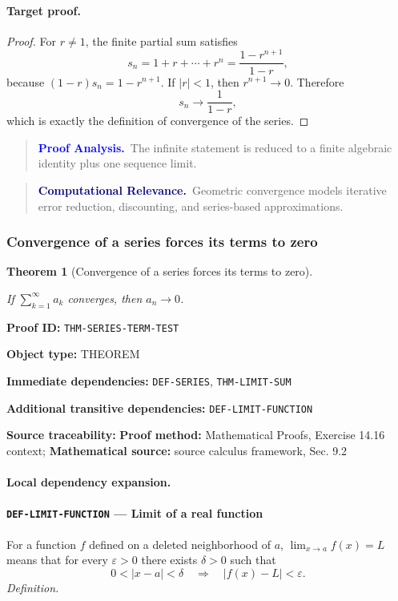 \documentclass[10pt]{article}
\newcommand{\pidraw}[1]{\begingroup\urlstyle{tt}\nolinkurl{#1}\endgroup}
\newtheorem{theorem}{Theorem}[section]
\theoremstyle{definition}
\theoremstyle{remark}
\newenvironment{proofanalysis}
{\begin{quote}\small\noindent\textbf{\textcolor{blue}{Proof Analysis.}}\ }
{\end{quote}}
\newenvironment{computationalrelevance}
{\begin{quote}\small\noindent\textbf{\textcolor{navy}{Computational Relevance.}}\ }
{\end{quote}}
\newcommand{\meta}[2]{\noindent\textbf{#1:} #2\par}
\begin{document}
\paragraph{Target proof.}

\begin{proof}

For $r\ne1$, the finite partial sum satisfies
\[
s_n=1+r+\cdots+r^n=\frac{1-r^{n+1}}{1-r},
\]
because $(1-r)s_n=1-r^{n+1}$. If $|r|<1$, then $r^{n+1}\to0$.
Therefore
\[
s_n\to\frac{1}{1-r},
\]
which is exactly the definition of convergence of the series.

\end{proof}

\begin{proofanalysis}The infinite statement is reduced to a finite algebraic identity plus one sequence limit.\end{proofanalysis}

\begin{computationalrelevance}Geometric convergence models iterative error reduction, discounting, and series-based approximations.\end{computationalrelevance}

\subsubsection{Convergence of a series forces its terms to zero}

\begin{theorem}[Convergence of a series forces its terms to zero]\label{prf:THM-SERIES-TERM-TEST}

If $\sum_{k=1}^{\infty}a_k$ converges, then $a_n\to0$.

\end{theorem}

\meta{Proof ID}{\pidraw{THM-SERIES-TERM-TEST}}
\meta{Object type}{THEOREM}
\meta{Immediate dependencies}{\pidraw{DEF-SERIES}, \pidraw{THM-LIMIT-SUM}}
\meta{Additional transitive dependencies}{\pidraw{DEF-LIMIT-FUNCTION}}
\meta{Source traceability}{\textbf{Proof method:} Mathematical Proofs, Exercise 14.16 context; \textbf{Mathematical source:} source calculus framework, Sec. 9.2}

\paragraph{Local dependency expansion.}

\paragraph{\pidraw{DEF-LIMIT-FUNCTION} --- Limit of a real function}
For a function $f$ defined on a deleted neighborhood of $a$, $\lim_{x\to a}f(x)=L$ means that for every $\varepsilon>0$ there exists $\delta>0$ such that
\[
0<|x-a|<\delta\quad\Longrightarrow\quad |f(x)-L|<\varepsilon.
\]
\textit{Definition.}
\end{document}
